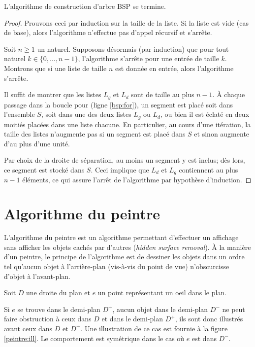 \begin{prop}
  L'algorithme de construction d'arbre BSP se termine.
\end{prop}
\begin{proof}
  Prouvons ceci par induction sur la taille de la liste.
  Si la liste est vide (cas de base), alors l'algorithme n'effectue
  pas d'appel récursif et s'arrête.

  Soit $n\geq 1$ un naturel. Supposons désormais (par induction) que pour
  tout naturel $k\in\{0, \ldots, n-1\}$, l'algorithme s'arrête pour
  une entrée de taille $k$. Montrons que si une liste de taille $n$
  est donnée en entrée, alors l'algorithme s'arrête.

  Il suffit de montrer que les listes $L_g$ et $L_d$ sont de taille
  au plus $n-1$. \`{A} chaque passage dans la boucle pour (ligne \ref{bsp:for}), un segment
  est placé soit dans l'ensemble $S$, soit dans une des deux listes
  $L_g$ ou $L_d$, ou bien il est éclaté en deux moitiés placées
  dans une liste chacune. En particulier, au cours d'une itération,
  la taille des listes n'augmente pas si un segment est placé dans $S$
  et sinon augmente d'au plus d'une unité.

  Par choix de la droite de séparation,
  au moins un segment y est inclus; dès lors, ce segment est stocké
  dans $S$. Ceci implique que $L_d$ et $L_g$ contiennent au plus $n-1$
  éléments, ce qui assure l'arrêt de l'algorithme par hypothèse d'induction.
\end{proof}


\section{Algorithme du peintre}
L'algorithme du peintre est un algorithme permettant d'effectuer un
affichage sans afficher les objets cachés par d'autres (\emph{hidden surface
  removal}). \`{A} la manière d'un peintre, le principe de l'algorithme est
de dessiner les objets dans un ordre tel qu'aucun objet à l'arrière-plan
(vis-à-vis du point de vue) n'obscurcisse d'objet à l'avant-plan.

Soit $D$ une droite du plan et $e$ un point représentant un oeil dans
le plan.

Si $e$ se trouve dans le demi-plan $D^+$, aucun objet dans le
demi-plan $D^-$ ne peut faire obstruction à ceux dans $D$ et dans le
demi-plan $D^+$, ils sont donc \og{}illustrés\fg{} avant ceux dans $D$ et $D^+$.
Une illustration de ce cas est fournie à la figure \ref{peintre:ill}.
Le comportement est symétrique dans le cas où $e$ est dans $D^-$.

